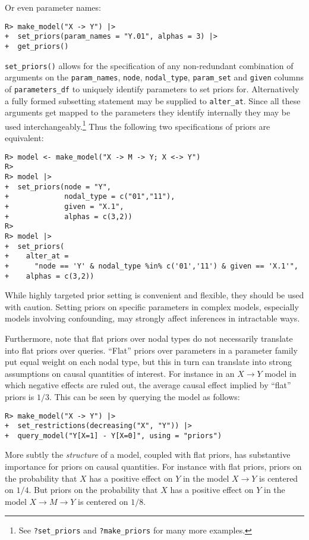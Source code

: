 \documentclass[
  11pt,
  article]{jss}
\begin{document}
Or even parameter names:

\begin{verbatim}
R> make_model("X -> Y") |>
+  set_priors(param_names = "Y.01", alphas = 3) |>
+  get_priors()
\end{verbatim}

\texttt{set\_priors()} allows for the specification of any non-redundant
combination of arguments on the \texttt{param\_names}, \texttt{node},
\texttt{nodal\_type}, \texttt{param\_set} and \texttt{given} columns of
\texttt{parameters\_df} to uniquely identify parameters to set priors
for. Alternatively a fully formed subsetting statement may be supplied
to \texttt{alter\_at}. Since all these arguments get mapped to the
parameters they identify internally they may be used
interchangeably.\footnote{See \texttt{?set\_priors} and
  \texttt{?make\_priors} for many more examples.} Thus the following two
specifications of priors are equivalent:

\begin{verbatim}
R> model <- make_model("X -> M -> Y; X <-> Y")
R> 
R> model |>
+  set_priors(node = "Y", 
+             nodal_type = c("01","11"), 
+             given = "X.1", 
+             alphas = c(3,2)) 
R> 
R> model |>
+  set_priors(
+    alter_at = 
+      "node == 'Y' & nodal_type %in% c('01','11') & given == 'X.1'", 
+    alphas = c(3,2)) 
\end{verbatim}

While highly targeted prior setting is convenient and flexible, they
should be used with caution. Setting priors on specific parameters in
complex models, especially models involving confounding, may strongly
affect inferences in intractable ways.

Furthermore, note that flat priors over nodal types do not necessarily
translate into flat priors over queries. ``Flat'' priors over parameters
in a parameter family put equal weight on each nodal type, but this in
turn can translate into strong assumptions on causal quantities of
interest. For instance in an \(X \rightarrow Y\) model in which negative
effects are ruled out, the average causal effect implied by ``flat''
priors is \(1/3\). This can be seen by querying the model as follows:

\begin{verbatim}
R> make_model("X -> Y") |>
+  set_restrictions(decreasing("X", "Y")) |>
+  query_model("Y[X=1] - Y[X=0]", using = "priors")
\end{verbatim}

More subtly the \emph{structure} of a model, coupled with flat priors,
has substantive importance for priors on causal quantities. For instance
with flat priors, priors on the probability that \(X\) has a positive
effect on \(Y\) in the model \(X \rightarrow Y\) is centered on \(1/4\).
But priors on the probability that \(X\) has a positive effect on \(Y\)
in the model \(X \rightarrow M \rightarrow Y\) is centered on \(1/8\).
\end{document}
